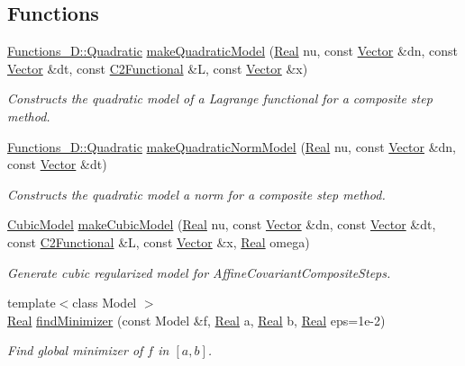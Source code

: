 \subsection*{Functions}
\begin{DoxyCompactItemize}
\item 
\hyperlink{classSpacy_1_1Functions__1D_1_1Quadratic}{Functions\+\_\+D\+::\+Quadratic} \hyperlink{namespaceSpacy_1_1CompositeStep_ad4acace8423370ac1b3d53a03fbde523}{make\+Quadratic\+Model} (\hyperlink{classSpacy_1_1Real}{Real} nu, const \hyperlink{classSpacy_1_1Vector}{Vector} \&dn, const \hyperlink{classSpacy_1_1Vector}{Vector} \&dt, const \hyperlink{classSpacy_1_1C2Functional}{C2\+Functional} \&L, const \hyperlink{classSpacy_1_1Vector}{Vector} \&x)
\begin{DoxyCompactList}\small\item\em Constructs the quadratic model of a Lagrange functional for a composite step method. \end{DoxyCompactList}\item 
\hyperlink{classSpacy_1_1Functions__1D_1_1Quadratic}{Functions\+\_\+D\+::\+Quadratic} \hyperlink{namespaceSpacy_1_1CompositeStep_a2d9442c6e622766cb33dc14aa497c945}{make\+Quadratic\+Norm\+Model} (\hyperlink{classSpacy_1_1Real}{Real} nu, const \hyperlink{classSpacy_1_1Vector}{Vector} \&dn, const \hyperlink{classSpacy_1_1Vector}{Vector} \&dt)
\begin{DoxyCompactList}\small\item\em Constructs the quadratic model a norm for a composite step method. \end{DoxyCompactList}\item 
\hyperlink{classSpacy_1_1CompositeStep_1_1CubicModel}{Cubic\+Model} \hyperlink{namespaceSpacy_1_1CompositeStep_a408c87c25b624012e03bca53e6ec3d10}{make\+Cubic\+Model} (\hyperlink{classSpacy_1_1Real}{Real} nu, const \hyperlink{classSpacy_1_1Vector}{Vector} \&dn, const \hyperlink{classSpacy_1_1Vector}{Vector} \&dt, const \hyperlink{classSpacy_1_1C2Functional}{C2\+Functional} \&L, const \hyperlink{classSpacy_1_1Vector}{Vector} \&x, \hyperlink{classSpacy_1_1Real}{Real} omega)
\begin{DoxyCompactList}\small\item\em Generate cubic regularized model for Affine\+Covariant\+Composite\+Steps. \end{DoxyCompactList}\item 
{\footnotesize template$<$class Model $>$ }\\\hyperlink{classSpacy_1_1Real}{Real} \hyperlink{namespaceSpacy_1_1CompositeStep_adffb0e7fa07418c47de2474156d90a35}{find\+Minimizer} (const Model \&f, \hyperlink{classSpacy_1_1Real}{Real} a, \hyperlink{classSpacy_1_1Real}{Real} b, \hyperlink{classSpacy_1_1Real}{Real} eps=1e-\/2)
\begin{DoxyCompactList}\small\item\em Find global minimizer of $f$ in $[a,b]$. \end{DoxyCompactList}\end{DoxyCompactItemize}


